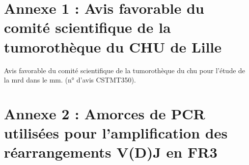 \section*{Annexe 1 : Avis favorable du comité scientifique de la tumorothèque du CHU de Lille}

\begin{annex}[htbp]
    \begin{center}
        \caption{
            Avis favorable du comité scientifique de la tumorothèque du \gls{chu} pour l'étude de la \gls{mrd} dans le \gls{mm}.
            (n° d'avis CSTMT350).
        }
        \label{anx:cstmt-mrd-mm}
    \end{center}
\end{annex}

\newpage

\section*{Annexe 2 : Amorces de PCR utilisées pour l'amplification des réarrangements V(D)J en FR3}

